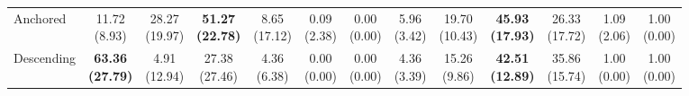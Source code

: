 {\begin{tabular}{l|cccccc|cccccc}
Anchored & \makecell{11.72 \\ (8.93)} & \makecell{28.27 \\ (19.97)} & {\cellcolor[HTML]{C8E6C9}} \bfseries \makecell{51.27 \\ (22.78)} & \makecell{8.65 \\ (17.12)} & \makecell{0.09 \\ (2.38)} & \makecell{0.00 \\ (0.00)} & \makecell{5.96 \\ (3.42)} & \makecell{19.70 \\ (10.43)} & {\cellcolor[HTML]{C8E6C9}} \bfseries \makecell{45.93 \\ (17.93)} & \makecell{26.33 \\ (17.72)} & \makecell{1.09 \\ (2.06)} & \makecell{1.00 \\ (0.00)} \\
Descending & \bfseries \makecell{63.36 \\ (27.79)} & \makecell{4.91 \\ (12.94)} & {\cellcolor[HTML]{C8E6C9}} \makecell{27.38 \\ (27.46)} & \makecell{4.36 \\ (6.38)} & \makecell{0.00 \\ (0.00)} & \makecell{0.00 \\ (0.00)} & \makecell{4.36 \\ (3.39)} & \makecell{15.26 \\ (9.86)} & {\cellcolor[HTML]{C8E6C9}} \bfseries \makecell{42.51 \\ (12.89)} & \makecell{35.86 \\ (15.74)} & \makecell{1.00 \\ (0.00)} & \makecell{1.00 \\ (0.00)} \\
\bottomrule
\end{tabular}
}%

